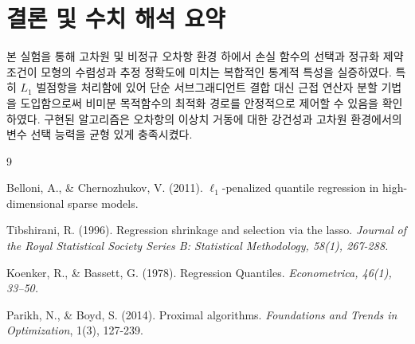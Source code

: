 \documentclass[10pt,a4paper]{article}
\begin{document}
\section{결론 및 수치 해석 요약}
본 실험을 통해 고차원 및 비정규 오차항 환경 하에서 손실 함수의 선택과 정규화 제약 조건이 모형의 수렴성과 추정 정확도에 미치는 복합적인 통계적 특성을 실증하였다. 특히 $L_1$ 벌점항을 처리함에 있어 단순 서브그래디언트 결합 대신 근접 연산자 분할 기법을 도입함으로써 비미분 목적함수의 최적화 경로를 안정적으로 제어할 수 있음을 확인하였다. 구현된 알고리즘은 오차항의 이상치 거동에 대한 강건성과 고차원 환경에서의 변수 선택 능력을 균형 있게 충족시켰다.

\begin{thebibliography}{9}

Belloni, A., \& Chernozhukov, V. (2011).
$\ell_1$-penalized quantile regression in high-dimensional sparse models.

Tibshirani, R. (1996). 
Regression shrinkage and selection via the lasso. 
\textit{Journal of the Royal Statistical Society Series B: Statistical Methodology, 58(1), 267-288.}

Koenker, R., \& Bassett, G. (1978). 
Regression Quantiles. 
\textit{Econometrica, 46(1), 33–50.}

Parikh, N., \& Boyd, S. (2014).
Proximal algorithms.
\textit{Foundations and Trends in Optimization}, 1(3), 127-239.

\end{thebibliography}
\end{document}

